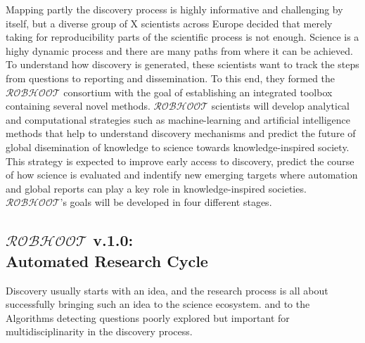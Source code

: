 \documentclass[12pt, a4paper]{article} %
\begin{document}

    
      Mapping partly the discovery process is highly informative and
      challenging by itself, but a diverse group of X scientists
      across Europe decided that merely taking for reproducibility
      parts of the scientific process is not enough. Science is a
      highy dynamic process and there are many paths from where it can
      be achieved. To understand how discovery is generated, these
      scientists want to track the steps from questions to reporting
      and dissemination. To this end, they formed the
      $\mathcal{ROBHOOT}$ consortium with the goal of establishing an
      integrated toolbox containing several novel
      methods. $\mathcal{ROBHOOT}$ scientists will develop analytical
      and computational strategies such as machine-learning and
      artificial intelligence methods that help to understand
      discovery mechanisms and predict the future of global
      disemination of knowledge to science towards knowledge-inspired
      society. This strategy is expected to improve early access to
      discovery, predict the course of how science is evaluated and
      indentify new emerging targets where automation and global
      reports can play a key role in knowledge-inspired
      societies. $\mathcal{ROBHOOT}$'s goals will be developed in four
      different stages.

  \subsection{{\bf $\mathcal{ROBHOOT}$ v.1.0}: \\Automated Research Cycle}
  Discovery usually starts with an idea, and the research process is
  all about successfully bringing such an idea to the science
  ecosystem. and to the Algorithms detecting questions poorly explored
  but important for multidisciplinarity in the discovery process.
\end{document}
